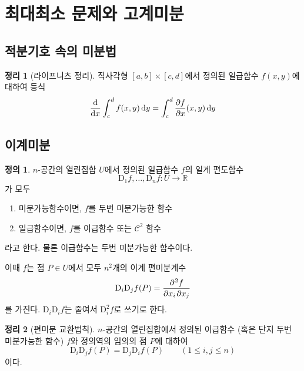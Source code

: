 \documentclass[unfonts,oneside,a4paper]{oblivoir}
\theoremstyle{definition}
\newtheorem{definition}{정의}[subsubsection]
\theoremstyle{theorem}
\newtheorem{theorem}{정리}[subsubsection]
\newcommand{\dd}{\mathrm{d}}
\newcommand{\dD}{\mathrm{D}}
\begin{document}
\section{최대최소 문제와 고계미분}
\subsection{적분기호 속의 미분법}

\begin{theorem}[라이프니츠 정리]
    직사각형 $[a, b] \times [c, d]$에서 정의된 일급함수 $f(x, y)$에 대하여 등식
    \begin{equation*}
        \diff*{\int_c^d f(x, y)\,\dd y}{x} = \int_c^d \diffp{f}{x} (x, y)\,\dd y
    \end{equation*}
\end{theorem}

\subsection{이계미분}

\begin{definition}
    $n$-공간의 열린집합 $U$에서 정의된 일급함수 $f$의 일계 편도함수
    \begin{equation*}
        \dD_1 f, \dots, \dD_n f: U \rightarrow \mathbb R
    \end{equation*}
    가 모두
    \begin{enumerate}
        \item 미분가능함수이면, $f$를 두번 미분가능한 함수
        \item 일급함수이면, $f$를 이급함수 또는 $\mathcal C^2$ 함수
    \end{enumerate}
    라고 한다.
    물론 이급함수는 두번 미분가능한 함수이다.

    이때 $f$는 점 $P \in U$에서 모두 $n^2$개의 이계 편미분계수
    \begin{equation*}
        \dD_i \dD_j f(P) = \diffp{f}{x_i, x_j}
    \end{equation*}
    를 가진다.
    $\dD_i \dD_i f$는 줄여서 $\dD_i^2 f$로 쓰기로 한다.
\end{definition}

\begin{theorem}[편미분 교환법칙]
    $n$-공간의 열린집합에서 정의된 이급함수 (혹은 단지 두번 미분가능한 함수) $f$와 정의역의 임의의 점 $P$에 대하여
    \begin{equation*}
        \dD_i \dD_j f(P) = \dD_j \dD_i f(P) \qquad (1 \leq i, j \leq n)
    \end{equation*}
    이다.
\end{theorem}
\end{document}
